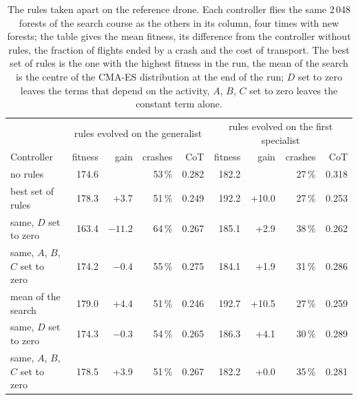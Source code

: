 \begin{table}[htbp]
\centering
\small
\begin{tabularx}{\textwidth}{>{\raggedright\arraybackslash}X r r r r r r r r}
\hline
 & \multicolumn{4}{c}{rules evolved on the generalist} & \multicolumn{4}{c}{rules evolved on the first specialist} \\
Controller & fitness & gain & crashes & CoT & fitness & gain & crashes & CoT \\
\hline
no rules & 174.6 &  & 53\,\% & 0.282 & 182.2 &  & 27\,\% & 0.318 \\
best set of rules & 178.3 & +3.7 & 51\,\% & 0.249 & 192.2 & +10.0 & 27\,\% & 0.253 \\
same, $D$ set to zero & 163.4 & $-11.2$ & 64\,\% & 0.267 & 185.1 & +2.9 & 38\,\% & 0.262 \\
same, $A$, $B$, $C$ set to zero & 174.2 & $-0.4$ & 55\,\% & 0.275 & 184.1 & +1.9 & 31\,\% & 0.286 \\
\hline
mean of the search & 179.0 & +4.4 & 51\,\% & 0.246 & 192.7 & +10.5 & 27\,\% & 0.259 \\
same, $D$ set to zero & 174.3 & $-0.3$ & 54\,\% & 0.265 & 186.3 & +4.1 & 30\,\% & 0.289 \\
same, $A$, $B$, $C$ set to zero & 178.5 & +3.9 & 51\,\% & 0.267 & 182.2 & +0.0 & 35\,\% & 0.281 \\
\hline
\end{tabularx}
\caption[The rules taken apart on the reference drone]{The rules taken apart on the reference drone. Each controller flies the same 2\,048 forests of the search course as the others in its column, four times with new forests; the table gives the mean fitness, its difference from the controller without rules, the fraction of flights ended by a crash and the cost of transport. The best set of rules is the one with the highest fitness in the run, the mean of the search is the centre of the CMA-ES distribution at the end of the run; $D$ set to zero leaves the terms that depend on the activity, $A$, $B$, $C$ set to zero leaves the constant term alone.}
\label{tab:d-ablation-fixed}
\end{table}

